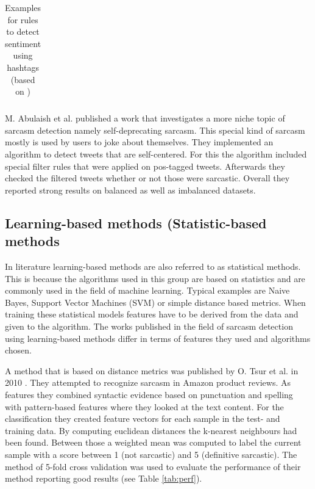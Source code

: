 \documentclass[sigconf,  review=false, nonacm=true]{acmart}
\begin{document}
\begin{table}[t]
\begin{tabular}{ccc}
\end{tabular}
\caption{Examples for rules to detect sentiment using hashtags (based on \cite{Who-cares-about-sarcastic-tweets?})}
\label{tab:rules}
\end{table}

M. Abulaish et al. \cite{Self-Deprecating-Sarcasm-Detection} published a work that investigates a more niche topic of sarcasm detection namely self-deprecating sarcasm. This special kind of sarcasm mostly is used by users to joke about themselves. They implemented an algorithm to detect tweets that are self-centered. For this the algorithm included special filter rules that were applied on pos-tagged tweets. Afterwards they checked the filtered tweets whether or not those were sarcastic. Overall they reported strong results on balanced as well as imbalanced datasets.  

\subsection{Learning-based methods (Statistic-based methods}

In literature learning-based methods are also referred to as statistical methods. This is because the algorithms used in this group are based on statistics and are commonly used in the field of machine learning. Typical examples are Naive Bayes, Support Vector Machines (SVM) or simple distance based metrics. When training these statistical models features have to be derived from the data and given to the algorithm. The works published in the field of sarcasm detection using learning-based methods differ in terms of features they used and algorithms chosen.

A method that is based on distance metrics was published by O. Tsur et al. in 2010 \cite{ICWSM}. They attempted to recognize sarcasm in Amazon product reviews. As features they combined syntactic evidence based on punctuation and spelling with pattern-based features where they looked at the text content. For the classification they created feature vectors for each sample in the test- and training data. By computing euclidean distances the k-nearest neighbours had been found. Between those a weighted mean was computed to label the current sample with a score between 1 (not sarcastic) and 5 (definitive sarcastic). The method of 5-fold cross validation was used to evaluate the performance of their method reporting good results (see Table \ref{tab:perf}).
\end{document}
